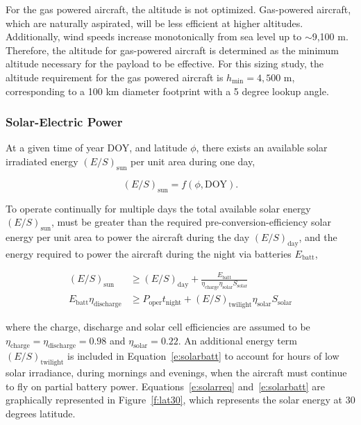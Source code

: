For the gas powered aircraft, the altitude is not optimized.  
Gas-powered aircraft, which are naturally aspirated, will be less efficient at higher altitudes.  
Additionally, wind speeds increase monotonically from sea level up to $\sim$9,100 m.  
Therefore, the altitude for gas-powered aircraft is determined as the minimum altitude necessary for the payload to be effective.\cite{orion}
For this sizing study, the altitude requirement for the gas powered aircraft is $h_{\text{min}}=4,500$ m, corresponding to a 100 km diameter footprint with a 5 degree lookup angle. 

\subsubsection{Solar-Electric Power}

At a given time of year DOY, and latitude $\phi$, there exists an available solar irradiated energy $(E/S)_{\text{sun}}$ per unit area during one day,

\begin{equation}
    \label{e:solarfunc}
    (E/S)_{\text{sun}} = f(\phi, \text{DOY}).
\end{equation}

To operate continually for multiple days the total available solar energy $(E/S)_{\text{sun}}$, must be greater than the required pre-conversion-efficiency solar energy per unit area to power the aircraft during the day $(E/S)_{\text{day}}$, and the energy required to power the aircraft during the night via batteries $E_{\text{batt}}$,\cite{solartech}

\begin{align}
    \label{e:solarreq}
    (E/S)_{\text{sun}}  &\geq (E/S)_{\text{day}} + \frac{E_{\text{batt}}}{\eta_{\text{charge}}\eta_{\text{solar}} S_{\text{solar}}} \\
    \label{e:solarbatt}
    E_{\text{batt}} \eta_{\text{discharge}} &\geq P_{\text{oper}}t_{\text{night}} + (E/S)_{\text{twilight}} \eta_{\text{solar}} S_{\text{solar}}
\end{align}

where the charge, discharge and solar cell efficiencies are assumed to be $\eta_{\text{charge}} = \eta_{\text{discharge}} = 0.98$ and $\eta_{\text{solar}}= 0.22$. 
An additional energy term $(E/S)_{\text{twilight}}$ is included in Equation~\eqref{e:solarbatt} to account for hours of low solar irradiance, during mornings and evenings, when the aircraft must continue to fly on partial battery power. 
Equations~\eqref{e:solarreq} and~\eqref{e:solarbatt} are graphically represented in Figure~\ref{f:lat30}, which represents the solar energy at 30 degrees latitude. 

